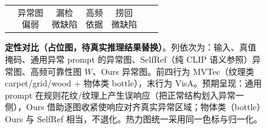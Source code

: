 \begin{figure}[t]
\begin{tabular}{c cccccc}
 & \ph{cClip!12}{异常图\\偏弱}
 & \ph{cClip!12}{漏检\\微缺陷}
 & \ph{cFreq!14}{高频\\依据}
 & \ph{cOurs!16}{捞回\\微缺陷} \\
\end{tabular}
\caption{\textbf{定性对比（占位图，待真实推理结果替换）}。列依次为：输入、真值掩码、通用异常 prompt 的异常图、SelfRef（纯 CLIP 语义参照）异常图、高频可靠性图 $W$、Ours 异常图。前四行为 MVTec（纹理类 carpet/grid/wood + 物体类 bottle），末行为 VisA。预期呈现：通用 prompt 在规则花纹/纹理上产生误响应（把正常结构划入异常一侧），Ours 借助逐图收紧使响应对齐真实异常区域；物体类（bottle）Ours 与 SelfRef 相当，不退化。热力图统一采用同一色标与归一化。}
\label{fig:qualitative}
\end{figure}
